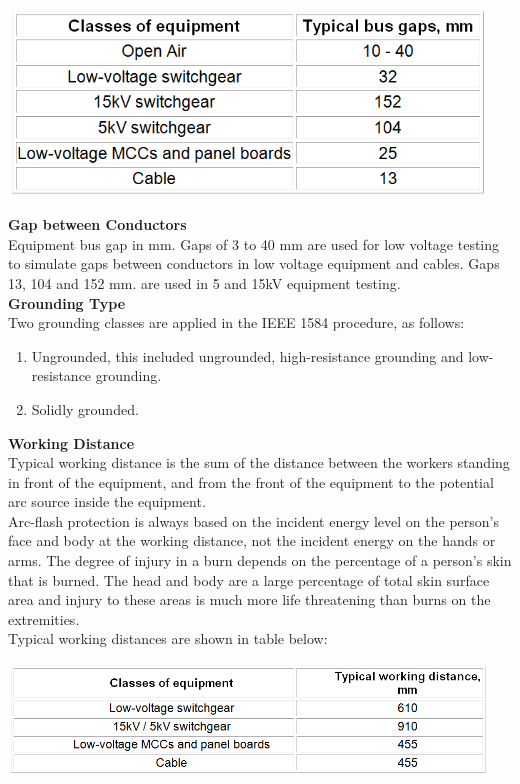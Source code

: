 \begin{center}
\includegraphics[width=5in, keepaspectratio=true]{Images/Gaps.png} \\
\end{center}

\noindent\textbf{Gap between Conductors } \\  
\noindent Equipment bus gap in mm. Gaps of 3 to 40 mm are used for low voltage testing to simulate gaps between conductors in low voltage equipment and cables. Gaps 13, 104 and 152 mm. are used in 5 and 15kV equipment testing.\\
   
\noindent\textbf{Grounding Type}    \\
\noindent Two grounding classes are applied in the IEEE 1584 procedure, as follows:
\begin{enumerate}
	\item Ungrounded, this included ungrounded, high-resistance grounding and low-resistance grounding.
	\item Solidly grounded. 
\end{enumerate}

\noindent\textbf{Working Distance }  \\ 
\noindent Typical working distance is the sum of the distance between the workers standing in front of the equipment, and from the front of the equipment to the potential arc source inside the equipment. \\

\noindent Arc-flash protection is always based on the incident energy level on the person's face and body at the working distance, not the incident energy on the hands or arms. The degree of injury in a burn depends on the percentage of a person's skin that is burned. The head and body are a large percentage of total skin surface area and injury to these areas is much more life threatening than burns on the extremities. \\

\noindent Typical working distances are shown in table below:
\begin{center}
\includegraphics[width=5in, keepaspectratio=true]{Images/WorkingDistance.png} \\
\end{center}


